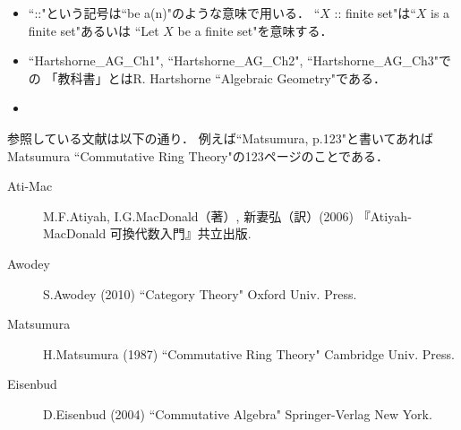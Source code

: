 \documentclass[a4paper]{jsarticle}
\begin{document}
\begin{itemize}
    \item
        ``::"という記号は``be a(n)"のような意味で用いる．
        ``$X$ :: finite set"は``$X$ is a finite set"あるいは
        ``Let $X$ be a finite set"を意味する．

    \item
        ``Hartshorne_AG_Ch1", ``Hartshorne_AG_Ch2", ``Hartshorne_AG_Ch3"での
        「教科書」とはR. Hartshorne ``Algebraic Geometry"である．

    \item
\end{itemize}

参照している文献は以下の通り．
例えば``Matsumura, p.123"と書いてあれば
Matsumura ``Commutative Ring Theory"の123ページのことである．
\begin{description}
    \item[Ati-Mac]
        M.F.Atiyah, I.G.MacDonald（著）, 新妻弘（訳）(2006)
        『Atiyah‐MacDonald 可換代数入門』共立出版.
    \item[Awodey]
        S.Awodey (2010)
        ``Category Theory" Oxford Univ. Press.
    \item[Matsumura]
        H.Matsumura (1987)
        ``Commutative Ring Theory" Cambridge Univ. Press.
    \item[Eisenbud]
        D.Eisenbud (2004)
        ``Commutative Algebra" Springer-Verlag New York.
\end{description}
\end{document}
